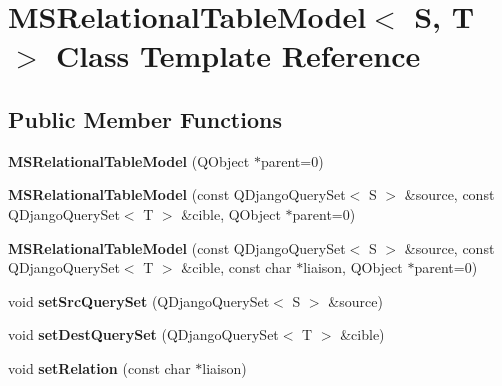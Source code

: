 \hypertarget{class_m_s_relational_table_model}{
\section{MSRelationalTableModel$<$ S, T $>$ Class Template Reference}
\label{class_m_s_relational_table_model}
}
\subsection*{Public Member Functions}
\begin{DoxyCompactItemize}
\item 
\hypertarget{class_m_s_relational_table_model_ac620e09ee48862189f3b69929ae395f4}{
{\bfseries MSRelationalTableModel} (QObject $\ast$parent=0)}
\label{class_m_s_relational_table_model_ac620e09ee48862189f3b69929ae395f4}

\item 
\hypertarget{class_m_s_relational_table_model_a61d02377ff167732f20130ba93809eb3}{
{\bfseries MSRelationalTableModel} (const QDjangoQuerySet$<$ S $>$ \&source, const QDjangoQuerySet$<$ T $>$ \&cible, QObject $\ast$parent=0)}
\label{class_m_s_relational_table_model_a61d02377ff167732f20130ba93809eb3}

\item 
\hypertarget{class_m_s_relational_table_model_a5429b24d5b56800a12aee682be513e02}{
{\bfseries MSRelationalTableModel} (const QDjangoQuerySet$<$ S $>$ \&source, const QDjangoQuerySet$<$ T $>$ \&cible, const char $\ast$liaison, QObject $\ast$parent=0)}
\label{class_m_s_relational_table_model_a5429b24d5b56800a12aee682be513e02}

\item 
\hypertarget{class_m_s_relational_table_model_a185615eeb111a5ae8c0ee0225173b315}{
void {\bfseries setSrcQuerySet} (QDjangoQuerySet$<$ S $>$ \&source)}
\label{class_m_s_relational_table_model_a185615eeb111a5ae8c0ee0225173b315}

\item 
\hypertarget{class_m_s_relational_table_model_a5a0865f228edf6036703263d5a3e8f52}{
void {\bfseries setDestQuerySet} (QDjangoQuerySet$<$ T $>$ \&cible)}
\label{class_m_s_relational_table_model_a5a0865f228edf6036703263d5a3e8f52}

\item 
\hypertarget{class_m_s_relational_table_model_ae2026ba19704d17d6d9400c29ab69a45}{
void {\bfseries setRelation} (const char $\ast$liaison)}
\label{class_m_s_relational_table_model_ae2026ba19704d17d6d9400c29ab69a45}


\end{DoxyCompactItemize}
